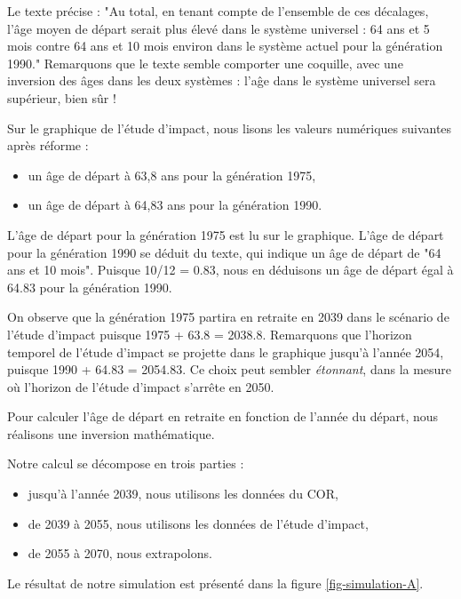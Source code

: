 \documentclass[10pt]{article}
\begin{document}
Le texte précise : "Au total, en tenant compte de l’ensemble de ces 
décalages, l’âge moyen de départ serait plus élevé dans le système 
universel : 64 ans et 5 mois contre 64 ans et 10 mois environ dans 
le système actuel pour la génération 1990." 
Remarquons que le texte semble comporter une coquille, avec une inversion 
des âges dans les deux systèmes : l'aĝe dans le système universel sera supérieur, 
bien sûr ! 

Sur le graphique de l'étude d'impact, nous lisons les valeurs numériques suivantes après réforme :
\begin{itemize}
\item un âge de départ à 63,8 ans pour la génération 1975,
\item un âge de départ à 64,83 ans pour la génération 1990.
\end{itemize}

L'âge de départ pour la génération 1975 est lu sur le graphique. 
L'âge de départ pour la génération 1990 se déduit du texte, qui 
indique un âge de départ de "64 ans et 10 mois". 
Puisque 10/12 = 0.83, nous en déduisons un âge de départ égal à 64.83 pour 
la génération 1990. 

On observe que la génération 1975 partira en retraite en 2039 dans le scénario de l'étude d'impact puisque 1975 + 63.8 = 2038.8.
Remarquons que l'horizon temporel de l'étude d'impact se projette dans le graphique jusqu'à l'année 2054, puisque 1990 + 64.83 = 2054.83. 
Ce choix peut sembler \emph{étonnant}, dans la mesure où l'horizon de l'étude d'impact 
s'arrête en 2050. 

Pour calculer l'âge de départ en retraite en fonction de l'année du départ, 
nous réalisons une inversion mathématique.  

Notre calcul se décompose en trois parties :
\begin{itemize}
\item jusqu'à l'année 2039, nous utilisons les données du COR, 
\item de 2039 à 2055, nous utilisons les données de l'étude d'impact,
\item de 2055 à 2070, nous extrapolons. 
\end{itemize}

Le résultat de notre simulation est présenté dans la figure \ref{fig-simulation-A}. 
\end{document}

